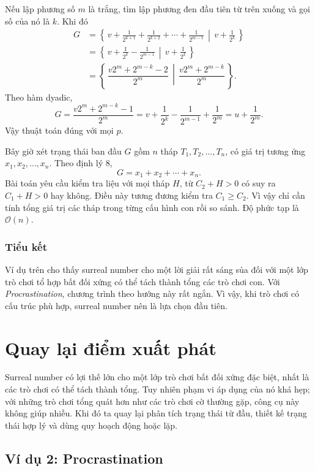 \documentclass[11pt]{article}
\newcommand{\Gpos}[2]{\left\{\,#1\,\middle|\,#2\,\right\}}
\newcommand{\Oh}{\mathcal{O}}
\begin{document}
Nếu lập phương số \(m\) là trắng, tìm lập phương đen đầu tiên từ trên xuống và
gọi số của nó là \(k\). Khi đó
\[
\begin{aligned}
G
&=\Gpos{v+\frac1{2^{k+1}}+\frac1{2^{k+2}}+\cdots+\frac1{2^{m-1}}}
        {v+\frac1{2^k}}\\
&=\Gpos{v+\frac1{2^k}-\frac1{2^{m-1}}}
        {v+\frac1{2^k}}\\
&=\Gpos{\dfrac{v2^m+2^{m-k}-2}{2^m}}
        {\dfrac{v2^m+2^{m-k}}{2^m}}.
\end{aligned}
\]
Theo hàm dyadic,
\[
  G=\frac{v2^m+2^{m-k}-1}{2^m}
   =v+\frac1{2^k}-\frac1{2^{m-1}}+\frac1{2^m}
   =u+\frac1{2^m}.
\]
Vậy thuật toán đúng với mọi \(p\).

Bây giờ xét trạng thái ban đầu \(G\) gồm \(n\) tháp
\(T_1,T_2,\ldots,T_n\), có giá trị tương ứng \(x_1,x_2,\ldots,x_n\). Theo định
lý 8,
\[
  G=x_1+x_2+\cdots+x_n.
\]
Bài toán yêu cầu kiểm tra liệu với mọi tháp \(H\), từ \(C_2+H>0\) có suy ra
\(C_1+H>0\) hay không. Điều này tương đương kiểm tra \(C_1\ge C_2\). Vì vậy
chỉ cần tính tổng giá trị các tháp trong từng cấu hình con rồi so sánh. Độ
phức tạp là \(\Oh(n)\).

\subsubsection*{Tiểu kết}

Ví dụ trên cho thấy surreal number cho một lời giải rất sáng sủa đối với một
lớp trò chơi tổ hợp bất đối xứng có thể tách thành tổng các trò chơi con. Với
\emph{Procrastination}, chương trình theo hướng này rất ngắn. Vì vậy, khi trò
chơi có cấu trúc phù hợp, surreal number nên là lựa chọn đầu tiên.

\section{Quay lại điểm xuất phát}

Surreal number có lợi thế lớn cho một lớp trò chơi bất đối xứng đặc biệt, nhất
là các trò chơi có thể tách thành tổng. Tuy nhiên phạm vi áp dụng của nó khá
hẹp; với những trò chơi tổng quát hơn như các trò chơi cờ thường gặp, công cụ
này không giúp nhiều. Khi đó ta quay lại phân tích trạng thái từ đầu, thiết kế
trạng thái hợp lý và dùng quy hoạch động hoặc lặp.

\subsection{Ví dụ 2: Procrastination}
\end{document}
